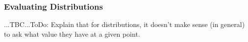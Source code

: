 
\subsubsection{Evaluating Distributions} ...TBC...ToDo: Explain that for distributions, it doesn't make sense (in general) to ask what value they have at a given point. 



